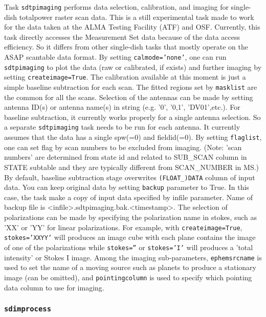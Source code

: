 Task {\tt sdtpimaging} performs data selection, calibration, and imaging for single-dish
totalpower raster scan data.  This is a still experimental task made to work for
the data taken at the ALMA Testing Facility (ATF) and OSF. Currently, this task directly
accesses the Measurement Set data because of the data access efficiency.
So it differs from other single-dish tasks that mostly operate on the ASAP scantable
data format.  By setting {\tt calmode='none'}, one can run {\tt sdtpimaging} to plot the data
(raw or calibrated, if exists) and further imaging by setting {\tt createimage=True}.
The calibration available at this moment is just a simple baseline subtraction for
each scan. The fitted regions set by {\tt masklist} are the common for all the scans.
Selection of the antennas can be made by setting antenna ID(s) or antenna name(s)
in string (e.g. '0', '0,1', 'DV01',etc.).
For baseline subtraction, it currently works properly for a single antenna selection.
So a separate {\tt sdtpimaging} task needs to be run for each antenna.
It currently assumes that the data has a single spw(=0) and fieldid(=0).
By setting {\tt flaglist}, one can set flag by scan numbers to be excluded from imaging.
(Note: 'scan numbers' are determined from state id and related to SUB\_SCAN column in STATE
subtable and they are typically different from SCAN\_NUMBER in MS.)
By default, baseline subtraction stage overwrites \verb!(FLOAT_)DATA! column of input data. You can 
keep original data by setting {\tt backup} parameter to True. In this case, the task make a 
copy of input data specified by infile parameter. Name of backup file is <infile>.sdtpimaging.bak.<timestamp>. 
The selection of polarizations can be made by specifying the polarization name in stokes,
such as 'XX' or 'YY' for linear polarizations. For example, with {\tt createimage=True},
{\tt stokes='XXYY'} will produces an image cube with each plane contains the image of one of 
the polarizations while {\tt stokes=''} or {\tt stokes='I'} will produces a 'total intensity' or Stokes I image. 
Among the imaging sub-parameters, {\tt ephemsrcname} is used to set the name of 
a moving source such as planets to produce a stationary image (can be omitted), and
{\tt pointingcolumn} is
used to specify which pointing data column to use for imaging.


\subsubsection{{\tt sdimprocess}}
\label{section:sd.sdtasks.tasks.sdimprocess}

